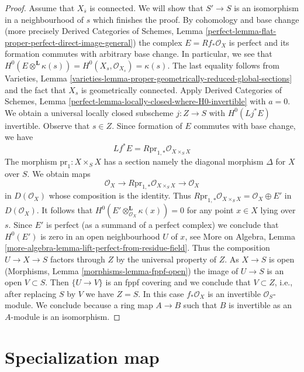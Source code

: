 \begin{proof}
\medskip\noindent
Assume that $X_{\overline{s}}$ is connected. We will show that
$S' \to S$ is an isomorphism in a neighbourhood of $s$ which
finishes the proof. By cohomology and base change
(more precisely Derived Categories of Schemes, Lemma
\ref{perfect-lemma-flat-proper-perfect-direct-image-general})
the complex $E = Rf_*\mathcal{O}_X$
is perfect and its formation commutes with arbitrary base change.
In particular, we see that
$H^0(E \otimes^\mathbf{L} \kappa(s)) =
H^0(X_s, \mathcal{O}_{X_s}) = \kappa(s)$.
The last equality follows from 
Varieties, Lemma
\ref{varieties-lemma-proper-geometrically-reduced-global-sections}
and the fact that $X_s$ is geometrically connected.
Apply Derived Categories of Schemes, Lemma
\ref{perfect-lemma-locally-closed-where-H0-invertible}
with $a = 0$. We obtain a universal locally closed subscheme
$j : Z \to S$ with $H^0(Lj^*E)$ invertible. Observe that $s \in Z$.
Since formation of $E$ commutes with base change, we have
$$
Lf^*E = R\text{pr}_{1, *}\mathcal{O}_{X \times_S X}
$$
The morphism $\text{pr}_1 : X \times_S X$ has a section
namely the diagonal morphism $\Delta$ for $X$ over $S$.
We obtain maps
$$
\mathcal{O}_X \longrightarrow R\text{pr}_{1, *}\mathcal{O}_{X \times_S X}
\longrightarrow \mathcal{O}_X
$$
in $D(\mathcal{O}_X)$ whose composition is the identity.
Thus $R\text{pr}_{1, *}\mathcal{O}_{X \times_S X} = \mathcal{O}_X \oplus E'$
in $D(\mathcal{O}_X)$. It follows that
$H^0(E' \otimes_{\mathcal{O}_X}^\mathbf{L} \kappa(x)) = 0$
for any point $x \in X$ lying over $s$.
Since $E'$ is perfect (as a summand of a perfect complex)
we conclude that $H^0(E')$ is zero in an open neighbourhood
$U$ of $x$, see More on Algebra, Lemma
\ref{more-algebra-lemma-lift-perfect-from-residue-field}.
Thus the composition $U \to X \to S$ factors through $Z$ by
the universal property of $Z$. As $X \to S$ is open
(Morphisms, Lemma \ref{morphisms-lemma-fppf-open})
the image of $U \to S$ is an open $V \subset S$.
Then $\{U \to V\}$ is an fppf covering and we conclude
that $V \subset Z$, i.e., after replacing $S$ by $V$
we have $Z = S$. In this case $f_*\mathcal{O}_X$ is an invertible
$\mathcal{O}_S$-module. We conclude because
a ring map $A \to B$ such that $B$ is invertible as an $A$-module
is an isomorphism.
\end{proof}






\section{Specialization map}
\label{section-specialization-map}

